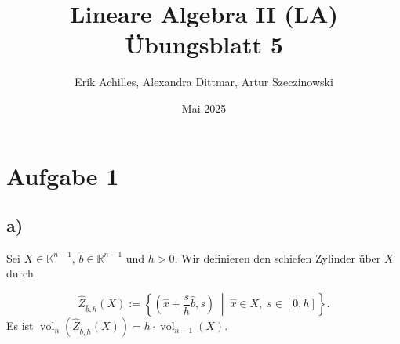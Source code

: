 \documentclass{article}
\title{Lineare Algebra II (LA) Übungsblatt 5}
\author{Erik Achilles, Alexandra Dittmar, Artur Szeczinowski}
\date{Mai 2025}
\begin{document}

\section*{Aufgabe 1}
\subsection*{a)}

Sei \( X \in \mathbb{K}^{n-1} \), \( \hat{b} \in \mathbb{R}^{n-1} \) und \( h > 0 \). Wir definieren den schiefen Zylinder über \( X \) durch

\[
\hat{Z}_{\hat{b},h}(X) := \left\{ 
\left( \hat{x} + \frac{s}{h} \hat{b}, s \right) \; \middle| \; \hat{x} \in X, \; s \in [0, h] 
\right\}.
\]
Es ist $\operatorname{vol}_n \left( \hat{Z}_{\hat{b}, h}(X) \right) = h \cdot \operatorname{vol}_{n-1}(X)$.
\end{document}
